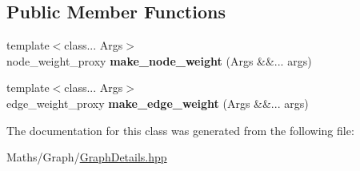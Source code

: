 \subsection*{Public Member Functions}
\begin{DoxyCompactItemize}
\item 
\mbox{\label{classsequoia_1_1maths_1_1graph__impl_1_1weight__maker_3_01_node_weight_pooling_00_01_edge_weight51eeaf74d246223c8fe9e272909992cd_a4dd1a08c3eea7a8c7977724fed431ca1}} 
{\footnotesize template$<$class... Args$>$ }\\node\+\_\+weight\+\_\+proxy {\bfseries make\+\_\+node\+\_\+weight} (Args \&\&... args)
\item 
\mbox{\label{classsequoia_1_1maths_1_1graph__impl_1_1weight__maker_3_01_node_weight_pooling_00_01_edge_weight51eeaf74d246223c8fe9e272909992cd_af79f5fa78dc3c7581cbdd91f4b48257c}} 
{\footnotesize template$<$class... Args$>$ }\\edge\+\_\+weight\+\_\+proxy {\bfseries make\+\_\+edge\+\_\+weight} (Args \&\&... args)
\end{DoxyCompactItemize}


The documentation for this class was generated from the following file\+:\begin{DoxyCompactItemize}
\item 
Maths/\+Graph/\mbox{\hyperlink{_graph_details_8hpp}{Graph\+Details.\+hpp}}\end{DoxyCompactItemize}
